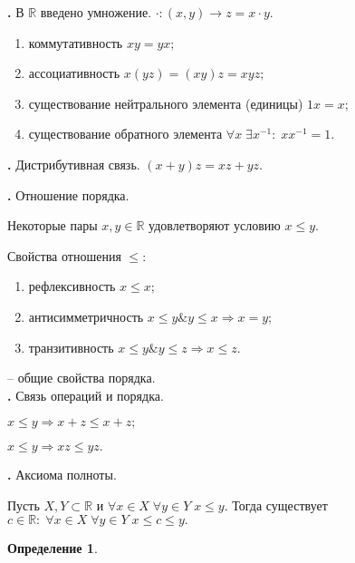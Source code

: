 \documentclass{article}
\newcommand{\RomanNumeralCaps}[1]
    {\MakeUppercase{\romannumeral #1}}
\newtheorem{Definition}{Определение}[section]
\begin{document}
{\bf \RomanNumeralCaps{2}.} В $\mathbb{R}$ введено умножение. $\cdot:(x,y)\rightarrow z=x\cdot y.$
\begin{enumerate}
\item коммутативность \quad $xy=yx;$
\item ассоциативность \quad $x(yz)=(xy)z=xyz;$
\item существование нейтрального элемента (единицы) \quad $1x=x;$
\item существование обратного элемента \quad $\forall x \; \exists x^{-1}: \; xx^{-1}=1.$
\end{enumerate}

{\bf \RomanNumeralCaps{3}.} Дистрибутивная связь. $(x+y)z=xz+yz.$

{\bf \RomanNumeralCaps{4}.} Отношение порядка. 

Некоторые пары $x,y\in\mathbb{R}$ удовлетворяют условию $x\leq y.$

Свойства отношения $\leq:$
\begin{enumerate}
\item рефлексивность \quad $x\leq x;$
\item антисимметричность \quad $x\leq y \& y\leq x \Rightarrow x=y;$
\item транзитивность \quad $x\leq y \& y\leq z \Rightarrow x\leq z.$
\end{enumerate}
-- общие свойства порядка.\\

{\bf \RomanNumeralCaps{5}.} Связь операций и порядка.

$x\leq y \Rightarrow x+z\leq x+z;$

$x\leq y \Rightarrow xz\leq yz.$

{\bf \RomanNumeralCaps{6}.} Аксиома полноты.

Пусть $X, Y\subset \mathbb{R}$ и $\forall x\in X \; \forall y\in Y \; x\leq y.$ Тогда существует $c\in\mathbb{R}: \; \forall x\in X \; \forall y\in Y \; x\leq c\leq y.$
\begin{Definition}

\end{Definition}
\end{document}
